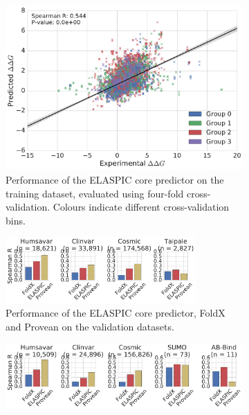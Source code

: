 
\begin{figure}[tb]
	\centering
	\begin{subfigure}[b]{1.0\textwidth}
		\centering
		\includegraphics[width=0.6\linewidth]{static/elaspic_training_set/validation/crossvalidation_performance_core.pdf}
		\caption{
			Performance of the ELASPIC core predictor on the training dataset, evaluated using four-fold cross-validation.
			Colours indicate different cross-validation bins.
		}
		\label{fig:crossvalidation_performance_core}
		\vspace*{10mm}
	\end{subfigure}
	\begin{subfigure}[b]{1.0\textwidth}
		\centering
		\includegraphics[width=0.8\textwidth]{static/elaspic_training_set/validation/validation_performance_core.pdf}
		\caption{
			Performance of the ELASPIC core predictor, FoldX and Provean on the validation datasets.
		}
		\label{fig:validation_performance_core}
		\vspace*{10mm}
	\end{subfigure}
	\begin{subfigure}[b]{1.0\textwidth}
		\centering
		\includegraphics[width=1.0\textwidth]{static/elaspic_training_set/validation/test_performance_core.pdf}

\end{subfigure}
\end{figure}

